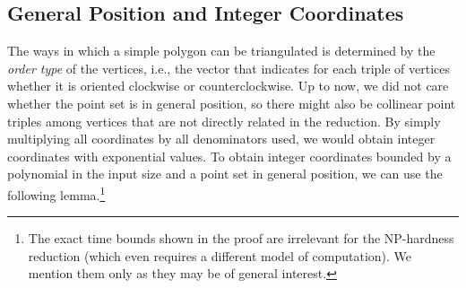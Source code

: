 \documentclass[a4paper,11pt]{article}
\begin{document}
\subsection{General Position and Integer Coordinates}
The ways in which a simple polygon can be triangulated is determined by the \emph{order type} of the vertices, i.e., the vector that indicates for
each triple of vertices whether it is oriented clockwise or counterclockwise.
Up to now, we did not care whether the point set is in general position, so there might also be collinear point triples among vertices that are not directly related in the reduction.
By simply multiplying all coordinates by all denominators used, we would obtain integer coordinates with exponential values.
To obtain integer coordinates bounded by a polynomial in the input size and a point set in general position, we can use the following lemma.\footnote{The exact time bounds shown in the proof are irrelevant for the NP-hardness reduction (which even requires a different model of computation).
We mention them only as they may be of general interest.}
\end{document}
